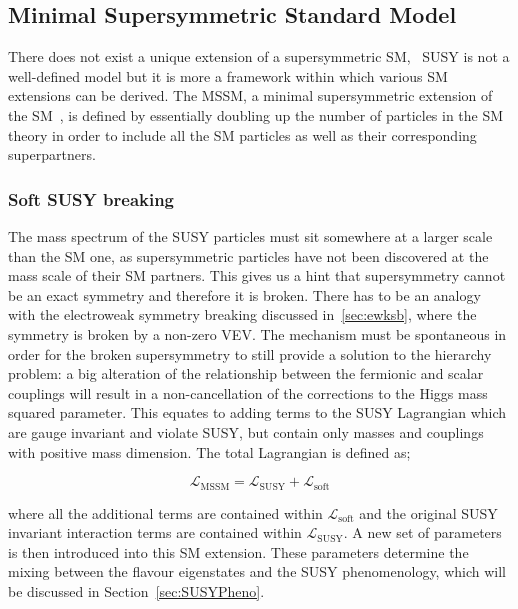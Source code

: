 		\subsection{Minimal Supersymmetric Standard Model}
		\label{sec:MSSM}
			
			There does not exist a unique extension of a supersymmetric \ac{SM}, \ie\ \ac{SUSY} is not a well-defined model but it is more a framework within which various \ac{SM} extensions can be derived.
			The \ac{MSSM}, a minimal supersymmetric extension of the \ac{SM}~\cite{Jegerlehner:2013nna}, is defined by essentially doubling up the number of particles in the \ac{SM} theory in order to include all the \ac{SM} particles as well as their corresponding superpartners.

			\subsubsection*{Soft SUSY breaking}
				
				The mass spectrum of the \ac{SUSY} particles must sit somewhere at a larger scale than the \ac{SM} one, as supersymmetric particles have not been discovered at the mass scale of their \ac{SM} partners. This gives us a hint that supersymmetry cannot be an exact symmetry and therefore it is broken. There has to be an analogy with the electroweak symmetry breaking discussed in~\ref{sec:ewksb}, where the symmetry is broken by a non-zero \ac{VEV}. The mechanism must be spontaneous in order for the broken supersymmetry to still provide a solution to the hierarchy problem: a big alteration of the relationship between the fermionic and scalar couplings will result in a non-cancellation of the corrections to the Higgs mass squared parameter.
				This equates to adding terms to the \ac{SUSY} Lagrangian which are gauge invariant and violate \ac{SUSY}, but contain only masses and couplings with positive mass dimension. The total Lagrangian is defined as;

				\begin{equation}
				\label{eq:soft_sb}
					\mathcal L_{\mathrm{MSSM}} = \mathcal {L_{\mathrm{SUSY}}} + \mathcal {L_{\mathrm{soft}}}
				\end{equation}

				\noindent where all the additional terms are contained within $\mathcal {L_{\mathrm{soft}}}$ and the original \ac{SUSY} invariant interaction terms are contained within $\mathcal {L_{\mathrm{SUSY}}}$. A new set of parameters is then introduced into this \ac{SM} extension. These parameters determine the mixing between the flavour eigenstates and the \ac{SUSY} phenomenology, which will be discussed in Section~\ref{sec:SUSYPheno}. 

